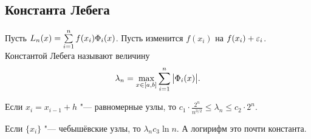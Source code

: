 \subsection{Константа Лебега}
Пусть $L_n(x) = \sum\limits_{i = 1}^{n} f(x_i) \Phi_i(x)$. Пусть изменится $f(x_i)$ на $f(x_i)+\varepsilon_i$. Константой Лебега называют величину
\[
  \lambda_n = \max\limits_{x\in[a,b]} \sum\limits_{i = 1}^{n} \big|\Phi_i(x)\big|.
\]

Если $x_i = x_{i-1} + h$ "--- равномерные узлы, то $c_1\cdot \frac{2^n}{n^{3/2}}\le \lambda_n \le c_2 \cdot 2^n$.

Если $\{x_i\}$ "--- чебышёвские узлы, то $\lambda_n c_3\ln n$. А логирифм это почти константа.

